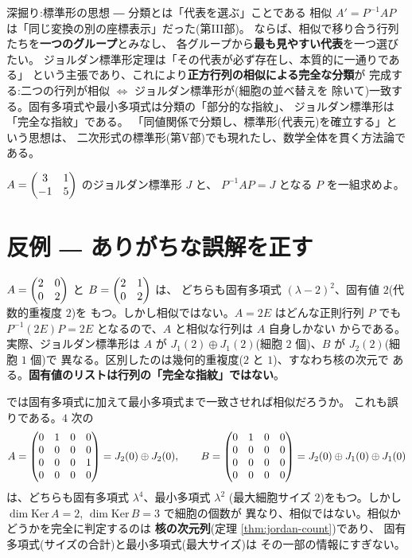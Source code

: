 \begin{itembox}[l]{深掘り:標準形の思想 ― 分類とは「代表を選ぶ」ことである}
相似 $A' = P^{-1}AP$ は「同じ変換の別の座標表示」だった(第III部)。
ならば、相似で移り合う行列たちを\textbf{一つのグループ}とみなし、
各グループから\textbf{最も見やすい代表}を一つ選びたい。
ジョルダン標準形定理は「その代表が必ず存在し、本質的に一通りである」
という主張であり、これにより\textbf{正方行列の相似による完全な分類}が
完成する:二つの行列が相似 $\iff$ ジョルダン標準形が(細胞の並べ替えを
除いて)一致する。固有多項式や最小多項式は分類の「部分的な指紋」、
ジョルダン標準形は「完全な指紋」である。
「同値関係で分類し、標準形(代表元)を確立する」という思想は、
二次形式の標準形(第V部)でも現れたし、数学全体を貫く方法論である。
\end{itembox}

\begin{mondai}\label{q:jordan}
$A = \begin{pmatrix}3 & 1 \\ -1 & 5\end{pmatrix}$ のジョルダン標準形 $J$ と、
$P^{-1}AP = J$ となる $P$ を一組求めよ。
\end{mondai}

\section{反例 ― ありがちな誤解を正す}

\begin{hanrei}[固有値と重複度が同じでも相似とは限らない]\label{hanrei:jordan-scalar}
$A = \begin{pmatrix}2 & 0 \\ 0 & 2\end{pmatrix}$ と $B = \begin{pmatrix}2 & 1 \\ 0 & 2\end{pmatrix}$ は、
どちらも固有多項式 $(\lambda - 2)^2$、固有値 $2$(代数的重複度 $2$)を
もつ。しかし相似ではない。$A = 2E$ はどんな正則行列 $P$ でも
$P^{-1}(2E)P = 2E$ となるので、$A$ と相似な行列は $A$ 自身しかない
からである。実際、ジョルダン標準形は $A$ が
$J_1(2) \oplus J_1(2)$(細胞 $2$ 個)、$B$ が $J_2(2)$(細胞 $1$ 個)で
異なる。区別したのは幾何的重複度($2$ と $1$)、すなわち核の次元で
ある。\textbf{固有値のリストは行列の「完全な指紋」ではない}。
\end{hanrei}

\begin{hanrei}\label{hanrei:jordan-charmin}
では固有多項式に加えて最小多項式まで一致させれば相似だろうか。
これも誤りである。$4$ 次の
\[
A = \begin{pmatrix}0 & 1 & 0 & 0 \\ 0 & 0 & 0 & 0 \\ 0 & 0 & 0 & 1 \\ 0 & 0 & 0 & 0\end{pmatrix}
= J_2(0) \oplus J_2(0), \qquad
B = \begin{pmatrix}0 & 1 & 0 & 0 \\ 0 & 0 & 0 & 0 \\ 0 & 0 & 0 & 0 \\ 0 & 0 & 0 & 0\end{pmatrix}
= J_2(0) \oplus J_1(0) \oplus J_1(0)
\]
は、どちらも固有多項式 $\lambda^4$、最小多項式 $\lambda^2$
(最大細胞サイズ $2$)をもつ。しかし
$\dim \mathrm{Ker}\,A = 2$, $\dim \mathrm{Ker}\,B = 3$ で細胞の個数が
異なり、相似ではない。相似かどうかを完全に判定するのは
\textbf{核の次元列}(定理 \ref{thm:jordan-count})であり、
固有多項式(サイズの合計)と最小多項式(最大サイズ)は
その一部の情報にすぎない。
\end{hanrei}

